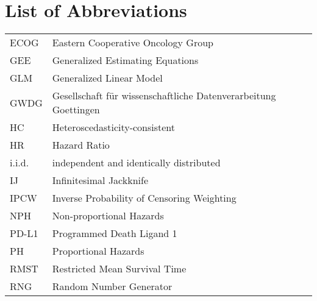 \section*{List of Abbreviations}

\begin{tabular}{@{} l @{\hskip 1in} l}
  ECOG & Eastern Cooperative Oncology Group \\
  GEE & Generalized Estimating Equations \\
  GLM & Generalized Linear Model \\
  GWDG & Gesellschaft für wissenschaftliche Datenverarbeitung Goettingen \\
  HC & Heteroscedasticity-consistent \\
  HR & Hazard Ratio \\
  i.i.d. & independent and identically distributed \\
  IJ & Infinitesimal Jackknife \\
  IPCW & Inverse Probability of Censoring Weighting \\
  NPH & Non-proportional Hazards \\
  PD-L1 & Programmed Death Ligand 1 \\
  PH & Proportional Hazards \\
  RMST & Restricted Mean Survival Time \\
  RNG & Random Number Generator \\
\end{tabular}
